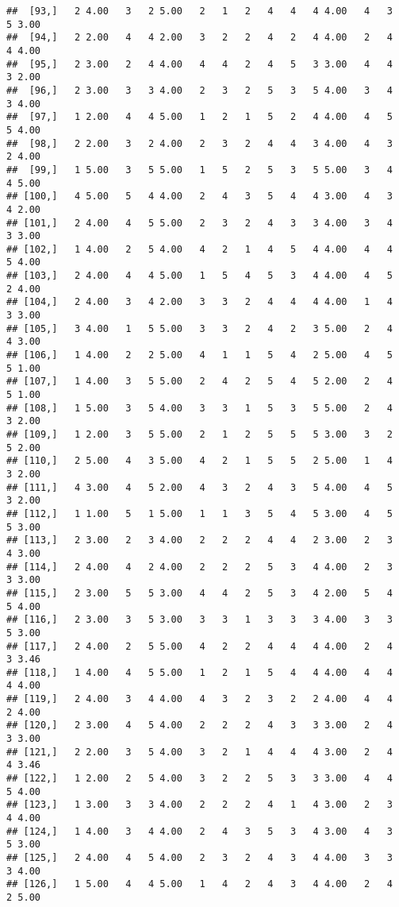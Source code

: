 \documentclass[]{article}
\begin{document}
\begin{verbatim}
##  [93,]   2 4.00   3   2 5.00   2   1   2   4   4   4 4.00   4   3   5 3.00
##  [94,]   2 2.00   4   4 2.00   3   2   2   4   2   4 4.00   2   4   4 4.00
##  [95,]   2 3.00   2   4 4.00   4   4   2   4   5   3 3.00   4   4   3 2.00
##  [96,]   2 3.00   3   3 4.00   2   3   2   5   3   5 4.00   3   4   3 4.00
##  [97,]   1 2.00   4   4 5.00   1   2   1   5   2   4 4.00   4   5   5 4.00
##  [98,]   2 2.00   3   2 4.00   2   3   2   4   4   3 4.00   4   3   2 4.00
##  [99,]   1 5.00   3   5 5.00   1   5   2   5   3   5 5.00   3   4   4 5.00
## [100,]   4 5.00   5   4 4.00   2   4   3   5   4   4 3.00   4   3   4 2.00
## [101,]   2 4.00   4   5 5.00   2   3   2   4   3   3 4.00   3   4   3 3.00
## [102,]   1 4.00   2   5 4.00   4   2   1   4   5   4 4.00   4   4   5 4.00
## [103,]   2 4.00   4   4 5.00   1   5   4   5   3   4 4.00   4   5   2 4.00
## [104,]   2 4.00   3   4 2.00   3   3   2   4   4   4 4.00   1   4   3 3.00
## [105,]   3 4.00   1   5 5.00   3   3   2   4   2   3 5.00   2   4   4 3.00
## [106,]   1 4.00   2   2 5.00   4   1   1   5   4   2 5.00   4   5   5 1.00
## [107,]   1 4.00   3   5 5.00   2   4   2   5   4   5 2.00   2   4   5 1.00
## [108,]   1 5.00   3   5 4.00   3   3   1   5   3   5 5.00   2   4   3 2.00
## [109,]   1 2.00   3   5 5.00   2   1   2   5   5   5 3.00   3   2   5 2.00
## [110,]   2 5.00   4   3 5.00   4   2   1   5   5   2 5.00   1   4   3 2.00
## [111,]   4 3.00   4   5 2.00   4   3   2   4   3   5 4.00   4   5   3 2.00
## [112,]   1 1.00   5   1 5.00   1   1   3   5   4   5 3.00   4   5   5 3.00
## [113,]   2 3.00   2   3 4.00   2   2   2   4   4   2 3.00   2   3   4 3.00
## [114,]   2 4.00   4   2 4.00   2   2   2   5   3   4 4.00   2   3   3 3.00
## [115,]   2 3.00   5   5 3.00   4   4   2   5   3   4 2.00   5   4   5 4.00
## [116,]   2 3.00   3   5 3.00   3   3   1   3   3   3 4.00   3   3   5 3.00
## [117,]   2 4.00   2   5 5.00   4   2   2   4   4   4 4.00   2   4   3 3.46
## [118,]   1 4.00   4   5 5.00   1   2   1   5   4   4 4.00   4   4   4 4.00
## [119,]   2 4.00   3   4 4.00   4   3   2   3   2   2 4.00   4   4   2 4.00
## [120,]   2 3.00   4   5 4.00   2   2   2   4   3   3 3.00   2   4   3 3.00
## [121,]   2 2.00   3   5 4.00   3   2   1   4   4   4 3.00   2   4   4 3.46
## [122,]   1 2.00   2   5 4.00   3   2   2   5   3   3 3.00   4   4   5 4.00
## [123,]   1 3.00   3   3 4.00   2   2   2   4   1   4 3.00   2   3   4 4.00
## [124,]   1 4.00   3   4 4.00   2   4   3   5   3   4 3.00   4   3   5 3.00
## [125,]   2 4.00   4   5 4.00   2   3   2   4   3   4 4.00   3   3   3 4.00
## [126,]   1 5.00   4   4 5.00   1   4   2   4   3   4 4.00   2   4   2 5.00

\end{verbatim}
\end{document}
